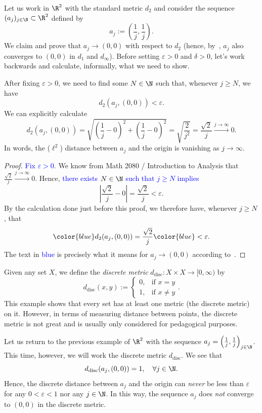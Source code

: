 \begin{eg}
	\label{eg_diag_vanish}
	Let us work in $\R^2$ with the standard metric $d_2$ and consider the sequence $(a_j)_{j\in\N}\subset \R^2$ defined by
	\[
	a_j := \left(\frac{1}{j},\frac{1}{j}\right).
	\]
	We claim and prove that $a_j\to (0,0)$ with respect to $d_2$ (hence, by~, $a_j$ also converges to $(0,0)$ in $d_1$ and $d_\infty$). Before setting $\varepsilon>0$ and $\delta>0$, let's work backwards and calculate, informally, what we need to show.
	
	After fixing $\varepsilon>0$, we need to find some $N\in\N$ such that, whenever $j\ge N$, we have
	\[
	d_2(a_j,(0,0))<\varepsilon.
	\]
	We can explicitly calculate
	\[
	d_2(a_j,(0,0)) = \sqrt{\left(\frac{1}{j} - 0\right)^2 + \left(\frac{1}{j} - 0\right)^2} = \sqrt{\frac{2}{j^2}} = \frac{\sqrt{2}}{j}\overset{j\to \infty}{\to}0.
	\]
	In words, the ($\ell^2$) distance between $a_j$ and the origin is vanishing as $j\to \infty$.
	\begin{proof}
		\textcolor{blue}{Fix $\varepsilon>0$.} We know from Math 2080 / Introduction to Analysis that $\frac{\sqrt{2}}{j}\overset{j\to \infty}{\to} 0$. Hence, \textcolor{blue}{there exists $N\in\N$ such that $j\ge N$ implies}
		\[
		\left|\frac{\sqrt{2}}{j} - 0\right| = \frac{\sqrt{2}}{j} < \varepsilon.
		\]
		By the calculation done just before this proof, we therefore have, whenever $j\ge N$, that
		\[
		{\color{blue}d_2(a_j,(0,0))} = \frac{\sqrt{2}}{j} {\color{blue}<\varepsilon.}
		\]
		The text in \textcolor{blue}{blue} is precisely what it means for $a_j\to (0,0)$ according to~.
	\end{proof}
\end{eg}
\begin{eg}
\label{eg:disc_metric}
Given any set $X$, we define the \textit{discrete metric} $d_\text{disc}:X\times X \to [0,\infty)$ by
\[
d_\text{disc}(x,y) := \left\{
\begin{array}{cl}
	0, 	&\text{if }x=y 	\\
	1, 	&\text{if }x\neq y
\end{array}
\right..
\]
This example shows that every set has at least one metric (the discrete metric) on it. However, in terms of measuring distance between points, the discrete metric is not great and is usually only considered for pedagogical purposes.

Let us return to the previous example of $\R^2$ with the sequence $a_j = \left(\frac{1}{j},\frac{1}{j}\right)_{j\in\N}$. This time, however, we will work the discrete metric $d_\text{disc}$. We see that
\[
d_\text{disc}(a_j,(0,0)) = 1,\quad \forall j\in\N.
\]
Hence, the discrete distance between $a_j$ and the origin can \textit{never} be less than $\varepsilon$ for any $0<\varepsilon<1$ nor any $j\in\N$. In this way, the sequence $a_j$ does \textit{not} converge to $(0,0)$ in the discrete metric.
\end{eg}
